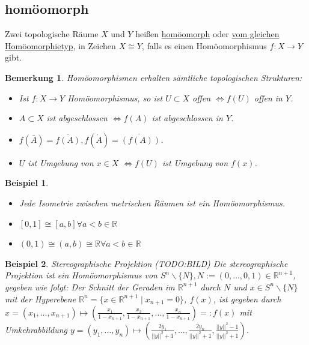 \documentclass[a4paper,11pt,notitlepage]{report}
\newtheorem{remark}{Bemerkung}[chapter]
\newtheorem{example}{Beispiel}[chapter]
\newcommand{\R}{{\ensuremath{\mathbb{R}}}}
\newenvironment{Kasten}[1]
{
\hspace{0.05\linewidth}
\begin{center}
\begin{minipage}{0.9\linewidth}
\setlength{\fboxsep}{10pt}
\definecolor{shadecolor}{gray}{1}
\definecolor{framecolor}{gray}{0}
\def\FrameCommand{\fcolorbox{framecolor}{shadecolor}}
\MakeFramed {\FrameRestore}
\subsection{#1}
\begin{itshape}
}
{
\end{itshape}
\endMakeFramed
\end{minipage}
\end{center}
}
\begin{document}
\begin{Kasten}{homöomorph}
	Zwei topologische Räume $X$ und $Y$ heißen \underline{homöomorph} oder \underline{vom gleichen Homöomorphietyp}, in Zeichen $X \cong Y$, falls es einen Homöomorphismus $f \colon X \rightarrow Y$ gibt.
\end{Kasten}

\begin{remark}
	Homöomorphismen erhalten sämtliche topologischen Strukturen:
	\begin{itemize}
		\item Ist $f \colon X \rightarrow Y$ Homöomorphismus, so ist $U \subset X$ offen $\Leftrightarrow f(U)$ offen in $Y$.
		\item $A \subset X$ ist abgeschlossen $\Leftrightarrow f(A)$ ist abgeschlossen in $Y$.
		\item $f(\bar{A}) = \overline{f(A)}, f(\mathring A) = \mathring{\left(f(A)\right)}$.
		\item $U$ ist Umgebung von $x \in X$ $\Leftrightarrow f(U)$ ist Umgebung von $f(x)$.
	\end{itemize}
\end{remark}

\begin{example}
	\begin{itemize}
		\item Jede Isometrie zwischen metrischen Räumen ist ein Homöomorphismus.
		\item $[0,1] \cong [a,b] \forall a < b \in \R$
		\item $(0,1) \cong (a,b) \cong \R \forall a < b \in \R$
	\end{itemize}
\end{example}

\begin{example}{Stereographische Projektion}
	(TODO:BILD)
	\newline
	Die stereographische Projektion ist ein Homöomorphismus von $S^n \backslash \{N\}, N := (0, \ldots, 0, 1) \in \R^{n+1}$, gegeben wie folgt:
	\newline
	Der Schnitt der Geraden im $\R^{n+1}$ durch $N$ und $x \in S^n \backslash \{N\}$ mit der Hyperebene $\R^n=\{x \in \R^{n+1} \mid x_{n+1} = 0 \}$, $f(x)$, ist gegeben durch $x = (x_1, \ldots, x_{n+1}) \mapsto (\frac{x_1}{1-x_{n+1}}, \frac{x_2}{1-x_{n+1}}, \ldots, \frac{x_n}{1-x_{n+1}}) =: f(x)$ mit Umkehrabbildung $y = (y_1, \ldots, y_n) \mapsto (\frac{2 y_1}{||y||^2+1}, \ldots, \frac{2 y_n}{||y||^2+1},\frac{||y||^2-1}{||y||^2+1})$.
\end{example}
\end{document}
